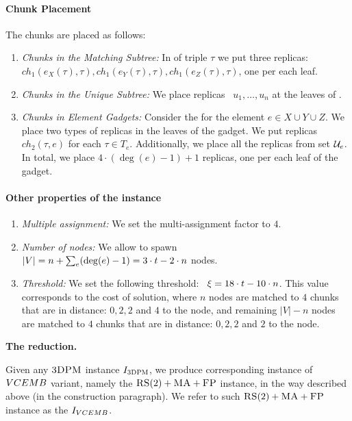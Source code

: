 \paragraph{Chunk Placement}
The chunks are placed as follows:
\begin{enumerate}
  \item \emph{Chunks in the Matching Subtree:} In {\TripleGadget} of triple $\tau$ we put
  three replicas:
 ~$ch_1(e_X(\tau), \tau), ch_1(e_Y(\tau), \tau), ch_1(e_Z(\tau), \tau)$, one per each leaf.
  \item \emph{Chunks in the Unique Subtree:} We place replicas
 ~$u_1,\ldots, u_n$ at the leaves of \UnqGadgets.
 \item \emph{Chunks in Element Gadgets:} Consider the \ElGadget{} for the element $e \in X\cup Y\cup Z$.
 We place two types of replicas in the leaves of the gadget.
 We put replicas $ch_2(\tau, e)$ for each $\tau \in T_e$.
 Additionally, we place all the replicas from set ${\mathcal{U}_e}$.
 In total, we place $4\cdot (\deg(e) - 1) + 1$ replicas, one per each leaf of the gadget.
\end{enumerate}

\paragraph{Other properties of the instance}
\begin{enumerate}
  \item \emph{Multiple assignment:} We set the multi-assignment factor to $4$.
  \item \emph{Number of nodes:} We allow to spawn
 ~$|V| = n + \sum_{e}(\deg(e)-1) = 3\cdot t - 2\cdot n$ nodes.
 \item \emph{Threshold:} We set the following threshold:
 ~$\xi = 18\cdot t - 10\cdot n$.
 This value corresponds to the cost of solution, where $n$ nodes are matched to $4$ chunks that are in distance: $0, 2, 2$ and $4$ to the node, and remaining $|V|-n$ nodes are matched to $4$ chunks that are in distance: $0, 2, 2$ and $2$ to the node.
\end{enumerate}

\textbf{The reduction.}

Given any $\textsc{3DPM}$ instance $I_{\textsc{3DPM}}$, we produce corresponding instance of $VCEMB$ variant, namely the $\textsc{RS}(2)+\textsc{MA}+\textsc{FP}$ instance, in the way described above (in the construction paragraph).
We refer to such $\textsc{RS}(2)+\textsc{MA}+\textsc{FP}$ instance as the $I_{VCEMB}$.

